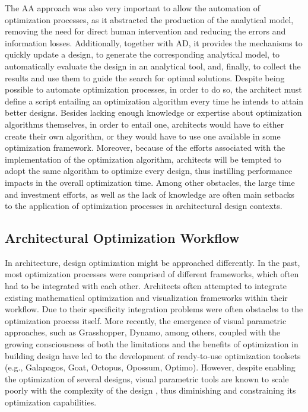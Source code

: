 	The \ac{AA} approach was also very important to allow the automation of optimization processes, as it abstracted the production of the analytical model, removing the need for direct human intervention and reducing the errors and information losses. Additionally, together with \ac{AD}, it provides the mechanisms to quickly update a design, to generate the corresponding analytical model, to automatically evaluate the design in an analytical tool, and, finally, to collect the results and use them to guide the search for optimal solutions. Despite being possible to automate optimization processes, in order to do so, the architect must define a script entailing an optimization algorithm every time he intends to attain better designs. Besides lacking enough knowledge or expertise about optimization algorithms themselves, in order to entail one, architects would have to either create their own algorithm, or they would have to use one available in some optimization framework. Moreover, because of the efforts associated with the implementation of the optimization algorithm, architects will be tempted to adopt the same algorithm to optimize every design, thus instilling performance impacts in the overall optimization time. Among other obstacles, the large time and investment efforts, as well as the lack of knowledge are often main setbacks to the application of optimization processes in architectural design contexts. 
	
\subsection{Architectural Optimization Workflow}
	
	In architecture, design optimization might be approached differently. In the past, most optimization processes were comprised of different frameworks, which often had to be integrated with each other. Architects often attempted to integrate existing mathematical optimization and visualization frameworks within their workflow. Due to their specificity integration problems were often obstacles to the optimization process itself. More recently, the emergence of visual parametric approaches, such as Grasshopper, Dynamo, among others, coupled with the growing consciousness of both the limitations and the benefits of optimization in building design have led to the development of ready-to-use optimization toolsets (e.g., Galapagos, Goat, Octopus, Opossum, Optimo). However, despite enabling the optimization of several designs, visual parametric tools are known to scale poorly with the complexity of the design , thus diminishing and constraining its optimization capabilities. 
	
